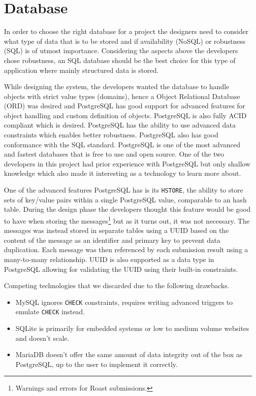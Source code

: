 \documentclass[12pt,a4paper]{report}
\begin{document}
\section{Database}
In order to choose the right database for a project the designers need to consider what type of data that is to be stored and if availability (NoSQL) or robustness (SQL) is of utmost importance.
Considering the aspects above the developers chose robustness, an SQL database should be the best choice for this type of application where mainly structured data is stored. 

While designing the system, the developers wanted the database to handle objects with strict value types (domains), hence a Object Relational Database (ORD) was desired and PostgreSQL has good support for advanced features for object handling and custom definition of objects. PostgreSQL is also fully ACID compliant\cite{pg-acid} which is desired. PostgreSQL has the ability to use advanced data constraints which enables better robustness. PostgreSQL also has good conformance with the SQL standard\cite{pg-sql-conformance}. PostgreSQL is one of the most advanced and fastest databases\cite{db-benchmark} that is free to use and open source.
One of the two developers in this project had prior experience with PostgreSQL but only shallow knowledge which also made it interesting as a technology to learn more about.

One of the advanced features PostgreSQL has is its \texttt{HSTORE}, the ability to store sets of key/value pairs within a single PostgreSQL value\cite{pg-hstore}, comparable to an hash table. During the design phase the developers thought this feature would be good to have when storing the messages\footnote{Warnings and errors for Roast submissions.} but as it turns out, it was not necessary. The messages was instead stored in separate tables using a UUID based on the content of the message as an identifier and primary key to prevent data duplication. Each message was then referenced by each submission result using a many-to-many relationship. UUID is also supported as a data type in PostgreSQL\cite{pg-uuid} allowing for validating the UUID using their built-in constraints.

Competing technologies that we discarded due to the following drawbacks.
\begin{itemize}
    \item MySQL ignores \texttt{CHECK} constraints\cite{mysql-check-constraint}, requires writing advanced triggers to emulate \texttt{CHECK} instead\cite{mysql-emulate-check}.
    \item SQLite is primarily for embedded systems or low to medium volume websites and doesn't scale\cite{sqlite-when-to-use}.
    \item MariaDB doesn't offer the same amount of data integrity out of the box as \\ PostgreSQL\cite{mariadb-data-integrity}, up to the user to implement it correctly. 
\end{itemize}
\end{document}
